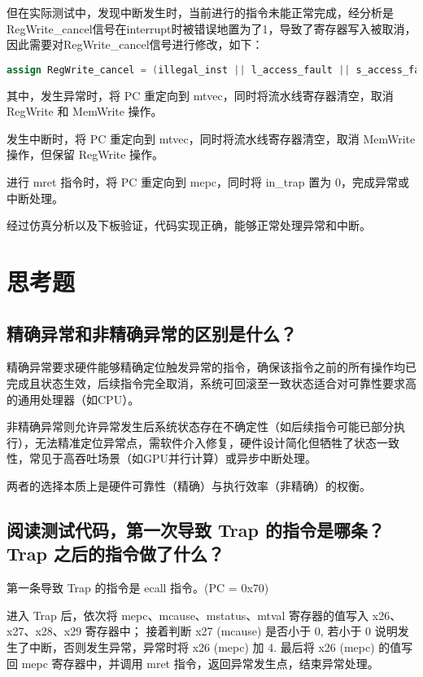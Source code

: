 \documentclass{article}
\begin{document}
但在实际测试中，发现中断发生时，当前进行的指令未能正常完成，经分析是RegWrite\_cancel信号在interrupt时被错误地置为了1，导致了寄存器写入被取消，因此需要对RegWrite\_cancel信号进行修改，如下：\par
\begin{lstlisting}[language=Verilog]
    assign RegWrite_cancel = (illegal_inst || l_access_fault || s_access_fault || ecall_m || mret) ? 1'b1 : 1'b0;
\end{lstlisting}

其中，发生异常时，将 PC 重定向到 mtvec，同时将流水线寄存器清空，取消 RegWrite 和 MemWrite 操作。\par
发生中断时，将 PC 重定向到 mtvec，同时将流水线寄存器清空，取消 MemWrite 操作，但保留 RegWrite 操作。\par
进行 mret 指令时，将 PC 重定向到 mepc，同时将 in\_trap 置为 0，完成异常或中断处理。\par

经过仿真分析以及下板验证，代码实现正确，能够正常处理异常和中断。\par

\section{思考题}
\subsection{精确异常和非精确异常的区别是什么？}
精确异常要求硬件能够精确定位触发异常的指令，确保该指令之前的所有操作均已完成且状态生效，后续指令完全取消，系统可回滚至一致状态适合对可靠性要求高的通用处理器（如CPU）。\par
非精确异常则允许异常发生后系统状态存在不确定性（如后续指令可能已部分执行），无法精准定位异常点，需软件介入修复，硬件设计简化但牺牲了状态一致性，常见于高吞吐场景（如GPU并行计算）或异步中断处理。\par
两者的选择本质上是硬件可靠性（精确）与执行效率（非精确）的权衡。\par

\subsection{阅读测试代码，第一次导致 Trap 的指令是哪条？Trap 之后的指令做了什么？}
第一条导致 Trap 的指令是 ecall 指令。(PC = 0x70) \par
进入 Trap 后，依次将 mepc、mcause、mstatus、mtval 寄存器的值写入 x26、x27、x28、x29 寄存器中；
接着判断 x27 (mcause) 是否小于 0, 若小于 0 说明发生了中断，否则发生异常，异常时将 x26 (mepc) 加 4.
最后将 x26 (mepc) 的值写回 mepc 寄存器中，并调用 mret 指令，返回异常发生点，结束异常处理。\par
\end{document}
